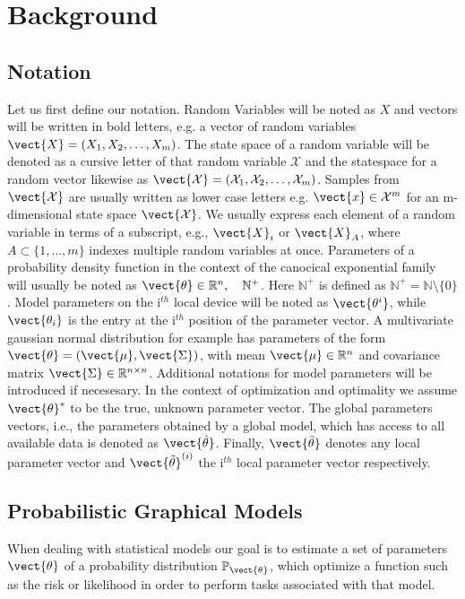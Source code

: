 \chapter{Background}
\label{chapter:kap2}

\section{Notation}
    \label{sec:nota}
    Let us first define our notation. 
    Random Variables will be noted as $X$ and vectors will be written in bold letters, e.g. a vector of random variables $\vect{X} = (X_1, X_2, \ldots, X_m)$.
    The state space of a random variable will be denoted as a cursive letter of that random variable $\mathcal{X}$ and the statespace for  a random vector likewise as $\vect{\mathcal{X}} = (\mathcal{X}_1, \mathcal{X}_2, \ldots, \mathcal{X}_m)$.
    Samples from $\vect{\mathcal{X}}$ are usually written as lower case letters e.g. $\vect{x} \in \mathcal{X}^m$ for an m-dimensional state space $\vect{\mathcal{X}}$.
    We usually express each element of a random variable in terms of a subscript, e.g., $\vect{X}_i$ or $\vect{X}_A$, where $A \subset\{1, \ldots, m\} $ indexes multiple random variables at once.
    Parameters of a probability density function in the context of the canocical exponential family will usually be noted as $\vect{\theta} \in \mathbb{R}^n, \quad \mathbb{N}^+$.
    Here $\mathbb{N}^+$ is defined as $ \mathbb{N}^+ = \mathbb{N} \setminus \{0\}$.
    Model parameters on the i$^{th}$ local device will be noted as $\vect{\theta^i}$, while $\vect{\theta_i}$ is the entry at the i$^{th}$ position of the parameter vector.
    A multivariate gaussian normal distribution for example has parameters of the form $\vect{\theta} = (\vect{\mu}, \vect{\Sigma})$, with mean $\vect{\mu} \in \mathbb{R}^{n}$ and covariance matrix $\vect{\Sigma} \in \mathbb{R}^{n \times n}$.
    Additional notations for model parameters will be introduced if necesesary.
    In the context of optimization and optimality we assume $\vect{\theta}^*$ to be the true, unknown parameter vector.
    The global parameters vectors, i.e., the parameters obtained by a global model, which has access to all available data is denoted as  $\vect{\hat{\theta}}$.
    Finally, $\vect{\tilde{\theta}}$ denotes any local parameter vector and $\vect{\tilde{\theta}}^{(i)}$ the i$^{th}$ local parameter vector respectively.

\section{Probabilistic Graphical Models}
\label{sec:pgm}
When dealing with statistical models our goal is to estimate a set of parameters $\vect{\theta}$ of a probability distribution $\mathbb{P}_{\vect{\theta}}$, which optimize a function such as the risk or likelihood in order to perform tasks associated with that model.

